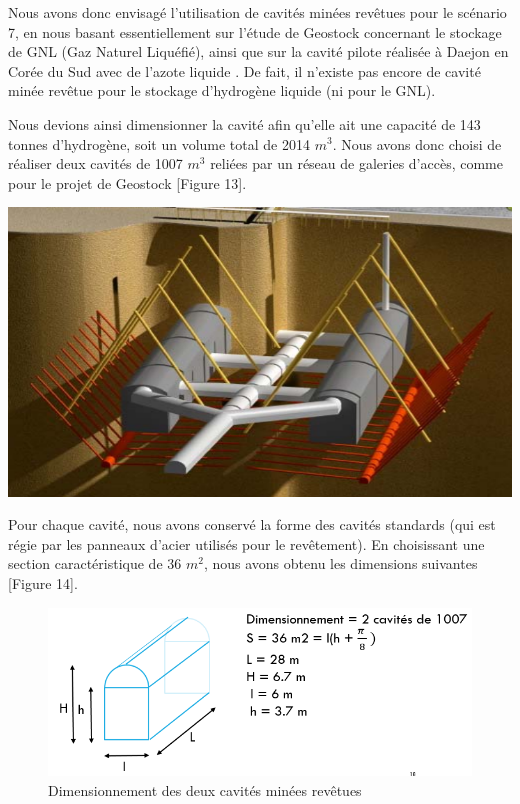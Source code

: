 \documentclass[11pt,french,a4paper]{article}
\begin{document}
\begin{multicols}{2}

Nous avons donc envisagé l’utilisation de cavités minées revêtues pour le scénario 7, en nous basant essentiellement sur l’étude de Geostock concernant le stockage de GNL (Gaz Naturel Liquéfié), ainsi que sur la cavité pilote réalisée à Daejon en Corée du Sud avec de l’azote liquide \cite{Nicolas_2008}. De fait, il n’existe pas encore de cavité minée revêtue pour le stockage d’hydrogène liquide (ni pour le GNL).

Nous devions ainsi dimensionner la cavité afin qu’elle ait une capacité de 143 tonnes d’hydrogène, soit un volume total de 2014 $m^3$. Nous avons donc choisi de réaliser deux cavités de 1007 $m^3$ reliées par un réseau de galeries d’accès, comme pour le projet de Geostock [Figure 13].\\

\begin{center}
\includegraphics[width=\linewidth]{image/chap2/Figure 3.ii.2-1.png}
\end{center}

\end{multicols}

Pour chaque cavité, nous avons conservé la forme des cavités standards (qui est régie par les panneaux d’acier utilisés pour le revêtement). En choisissant une section caractéristique de 36 $m^2$, nous avons obtenu les dimensions suivantes [Figure 14].\\

\begin{figure}[h!]
\centering
\includegraphics[width=.6\linewidth]{image/chap2/Figure 3.ii.2-2.png}
\caption{Dimensionnement des deux cavités minées revêtues}
\end{figure}
\end{document}

